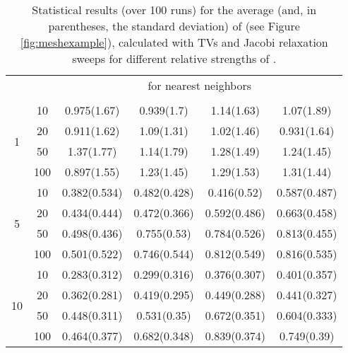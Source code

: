 \documentclass[final]{siamltex}
\begin{document}
\begin{table}[h]
\begin{center}
{
\begin{tabular}{|c|c|cccc|}
\hline
& & \multicolumn{4}{c|}{ for  nearest neighbors} \\ \cline{3-6}
 &  &  &  &  & \\
\hline
\multicolumn{1}{|c|}{\multirow{4}{*}{1}} &
\multicolumn{1}{|c|}{10} & 0.975(1.67) & 0.939(1.7) & 1.14(1.63) & 1.07(1.89)\\
\multicolumn{1}{|c|}{}                        &
\multicolumn{1}{|c|}{20} & 0.911(1.62) & 1.09(1.31) & 1.02(1.46) & 0.931(1.64) \\
\multicolumn{1}{|c|}{}                        &
\multicolumn{1}{|c|}{50} & 1.37(1.77) & 1.14(1.79) & 1.28(1.49) & 1.24(1.45) \\
\multicolumn{1}{|c|}{}                        &
\multicolumn{1}{|c|}{100} & 0.897(1.55) & 1.23(1.45) & 1.29(1.53) & 1.31(1.44) \\
\hline
\multicolumn{1}{|c|}{\multirow{4}{*}{5}} &
\multicolumn{1}{|c|}{10} & 0.382(0.534) & 0.482(0.428) & 0.416(0.52) & 0.587(0.487) \\
\multicolumn{1}{|c|}{}                        &
\multicolumn{1}{|c|}{20} & 0.434(0.444) & 0.472(0.366) & 0.592(0.486) & 0.663(0.458) \\
\multicolumn{1}{|c|}{}                        &
\multicolumn{1}{|c|}{50} &   0.498(0.436) & 0.755(0.53) & 0.784(0.526) & 0.813(0.455) \\
\multicolumn{1}{|c|}{}                        &
\multicolumn{1}{|c|}{100} & 0.501(0.522) & 0.746(0.544) & 0.812(0.549) & 0.816(0.535) \\
\hline
\multicolumn{1}{|c|}{\multirow{4}{*}{10}} &
\multicolumn{1}{|c|}{10} & 0.283(0.312) & 0.299(0.316) & 0.376(0.307) & 0.401(0.357) \\
\multicolumn{1}{|c|}{}                        &
\multicolumn{1}{|c|}{20} & 0.362(0.281) & 0.419(0.295) & 0.449(0.288) & 0.441(0.327) \\
\multicolumn{1}{|c|}{}                        &
\multicolumn{1}{|c|}{50} & 0.448(0.311) & 0.531(0.35) & 0.672(0.351) & 0.604(0.333) \\
\multicolumn{1}{|c|}{}                        &
\multicolumn{1}{|c|}{100} & 0.464(0.377) & 0.682(0.348) & 0.839(0.374) & 0.749(0.39) \\
\hline
\end{tabular}
}
\caption{Statistical results (over 100 runs) for the average (and, in parentheses,
the standard deviation) of  (see Figure
\ref{fig:meshexample}), calculated with
 TVs and  Jacobi relaxation sweeps for different relative strengths of .}
\label{tab:meshexampleNonDiag}
\end{center}
\end{table}
\end{document}
